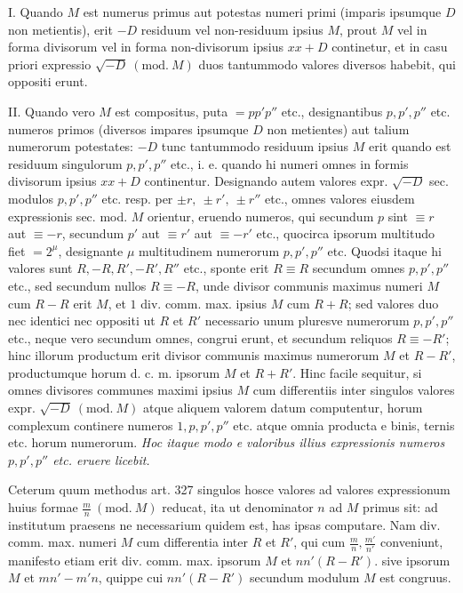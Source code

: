 I. Quando \(M\) est numerus primus aut potestas numeri primi (imparis ipsumque \(D\) non metientis), erit \(-D\) residuum vel non-residuum ipsius \(M\), prout \(M\) vel in forma divisorum vel in forma non-divisorum ipsius \(xx+D\) continetur, et in casu priori expressio \(\surd{-D}\ (\mathrm{mod.}\ M)\) duos tantummodo valores diversos habebit, qui oppositi erunt.

II. Quando vero \(M\) est compositus, puta \(=pp'p''\) etc., designantibus \(p,\allowbreak p',\allowbreak p''\) etc. numeros primos (diversos impares ipsumque \(D\) non metientes) aut talium numerorum potestates: \(-D\) tunc tantummodo residuum ipsius \(M\) erit quando est residuum singulorum \(p,\allowbreak p',\allowbreak p''\) etc., i. e. quando hi numeri omnes in formis divisorum ipsius \(xx+D\) continentur. Designando autem valores expr. \(\surd{-D}\) sec. modulos \(p,\allowbreak p',\allowbreak p''\) etc. resp. per \(\pm r,\allowbreak \ \pm r',\allowbreak \ \pm r''\) etc., omnes valores eiusdem expressionis sec. mod. \(M\) orientur, eruendo numeros, qui secundum \(p\) sint \(\equiv r\) aut \(\equiv-r\), secundum \(p'\) aut \(\equiv r'\) aut \(\equiv-r'\) etc., quocirca ipsorum multitudo fiet \(=2^\mu\), designante \(\mu\) multitudinem numerorum \(p,\allowbreak p',\allowbreak p''\) etc. Quodsi itaque hi valores sunt \(R,\allowbreak -R,\allowbreak R',\allowbreak -R',\allowbreak R''\) etc., sponte erit \(R\equiv R\) secundum omnes \(p,\allowbreak p',\allowbreak p''\) etc., sed secundum nullos \(R\equiv-R\), unde divisor communis
maximus numeri \(M\) cum \(R-R\) erit \(M\), et \(1\) div. comm. max. ipsius \(M\) cum \(R+R\); sed valores duo nec identici nec oppositi ut \(R\) et \(R'\) necessario unum pluresve numerorum \(p,\allowbreak p',\allowbreak p''\) etc., neque vero secundum omnes, congrui erunt, et secundum reliquos \(R\equiv-R'\); hinc illorum productum erit divisor communis maximus numerorum \(M\) et \(R-R'\), productumque horum d. c. m. ipsorum \(M\) et \(R+R'\). Hinc facile sequitur, si omnes divisores communes maximi ipsius \(M\) cum differentiis inter singulos valores expr. \(\surd{-D}\ (\mathrm{mod.}\ M)\) atque aliquem valorem datum computentur, horum complexum continere numeros \(1,\allowbreak p,\allowbreak p',\allowbreak p''\) etc. atque omnia producta e binis, ternis etc. horum numerorum. \textit{Hoc itaque modo e} \textit{valoribus illius expressionis numeros \(p,\allowbreak p',\allowbreak p''\) etc. eruere licebit.}

Ceterum quum methodus art. 327 singulos hosce valores ad valores expressionum huius formae \(\frac mn\ (\mathrm{mod.}\ M)\) reducat, ita ut denominator \(n\) ad \(M\) primus sit: ad institutum praesens ne necessarium quidem est, has ipsas computare. Nam div. comm. max. numeri \(M\) cum differentia inter \(R\) et \(R'\), qui cum \(\frac mn,\allowbreak \frac{m'}{n'}\) conveniunt, manifesto etiam erit div. comm. max. ipsorum \(M\) et \(nn'(R-R')\). sive ipsorum \(M\) et \(mn'-m'n\), quippe cui \(nn'(R-R')\) secundum modulum \(M\) est congruus.

